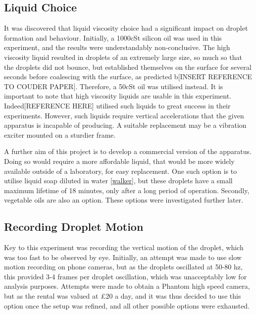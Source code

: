 \subsection{Liquid Choice}
It was discovered that liquid viscosity choice had a significant impact on droplet formation and behaviour. Initially, a 1000cSt silicon oil was used in this experiment, and the results were understandably non-conclusive. The high viscosity liquid resulted in droplets of an extremely large size, so much so that the droplets did not bounce, but established themselves on the surface for several seconds before coalescing with the surface, as predicted b[INSERT REFERENCE TO COUDER PAPER]. Therefore, a 50cSt oil was utilised instead. It is important to note that high viscosity liquids are usable in this experiment. Indeed[REFERENCE HERE] utilised such liquids to great success in their experiments. However, such liquids require vertical accelerations that the given apparatus is incapable of producing. A suitable replacement may be a vibration exciter mounted on a sturdier frame. 

A further aim of this project is to develop a commercial version of the apparatus. Doing so would require a more affordable liquid, that would be more widely available outside of a laboratory, for easy replacement. One such option is to utilise liquid soap diluted in water \ref{walker}, but these droplets have a small maximum lifetime of 18 minutes, only after a long period of operation. Secondly, vegetable oils are also an option. These options were investigated further later.

\subsection{Recording Droplet Motion}
Key to this experiment was recording the vertical motion of the droplet, which was too fast to be observed by eye. Initially, an attempt was made to use slow motion recording on phone cameras, but as the droplets oscillated at 50-80 hz, this provided 3-4 frames per droplet oscillation, which was unacceptably low for analysis purposes. Attempts were made to obtain a Phantom high speed camera, but as the rental was valued at £20 a day, and it was thus decided to use this option once the setup was refined, and all other possible options were exhausted. 

